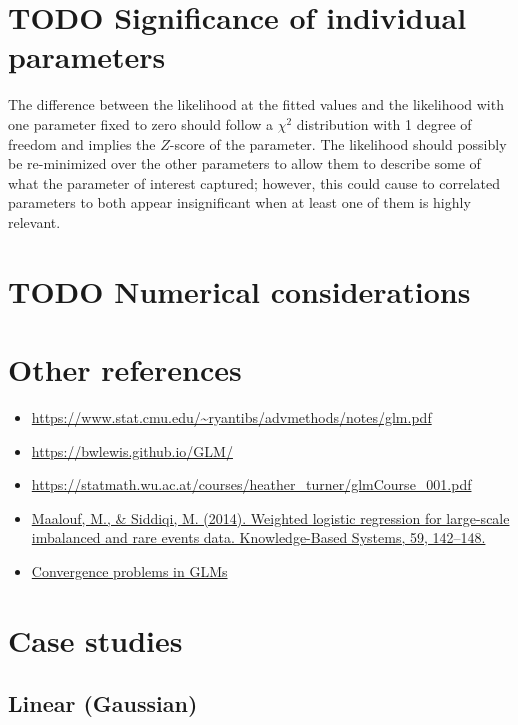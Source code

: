 \documentclass{article}
\begin{document}
\section{TODO Significance of individual parameters}

The difference between the likelihood at the fitted values and the likelihood
with one parameter fixed to zero should follow a \(\chi^2\) distribution with
1 degree of freedom and implies the \(Z\)-score of the parameter. The
likelihood should possibly be re-minimized over the other parameters to allow
them to describe some of what the parameter of interest captured; however, this
could cause to correlated parameters to both appear insignificant when at least
one of them is highly relevant.


\section{TODO Numerical considerations}

\section{Other references}

\begin{itemize}
\item \url{https://www.stat.cmu.edu/~ryantibs/advmethods/notes/glm.pdf}
\item \url{https://bwlewis.github.io/GLM/}
\item \url{https://statmath.wu.ac.at/courses/heather_turner/glmCourse_001.pdf}
\item \href{https://doi.org/10.1016/j.knosys.2014.01.012}{Maalouf, M., \& Siddiqi, M. (2014). Weighted logistic regression for large-scale imbalanced and rare events data. Knowledge-Based Systems, 59, 142–148.}
\item \href{https://journal.r-project.org/archive/2011-2/RJournal_2011-2_Marschner.pdf}{Convergence problems in GLMs}
\end{itemize}

\section{Case studies}

\subsection{Linear (Gaussian)}
\end{document}
